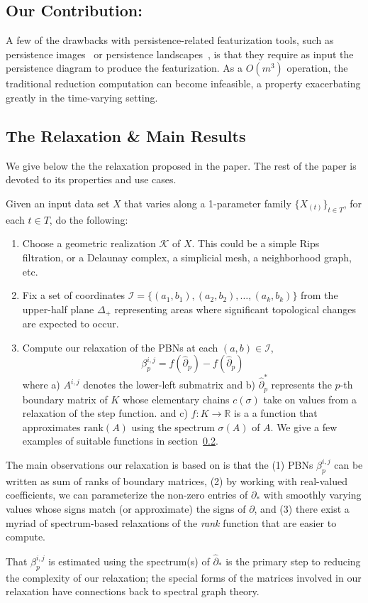\subsection{Our Contribution:}
A few of the drawbacks with persistence-related featurization tools, such as persistence images~\cite{} or persistence landscapes~\cite{}, is that they require as input the persistence diagram to produce the featurization. As a $O(m^3)$ operation, the traditional reduction computation can become infeasible, a property exacerbating greatly in the time-varying setting. 

\subsection{The Relaxation \& Main Results}
We give below the the relaxation proposed in the paper. The rest of the paper is devoted to its properties and use cases. 

Given an input data set $X$ that varies along a 1-parameter family $\{X_{(t)}\}_{t \in T}$, for each $t \in T$, do the following:
\begin{enumerate}
	\item Choose a geometric realization $\mathcal{K}$ of $X$. This could be a simple Rips filtration, or a Delaunay complex, a simplicial mesh, a neighborhood graph, etc. 
	\item Fix a set of coordinates $\mathcal{I} = \{(a_1,b_1), (a_2,b_2), \dots, (a_k,b_k)\}$ from the upper-half plane $\Delta_+$ representing areas where significant topological changes are expected to occur. 
	\item Compute our relaxation of the PBNs at each $(a,b) \in \mathcal{I}$, 
	$$ \beta_{p}^{i,j} = f(\hat{\partial}_p) -  f(\hat{\partial}_p) $$
	where 
	a) $A^{i,j}$ denotes the lower-left submatrix and
	b) $\hat{\partial}_p^{\ast}$ represents the $p$-th boundary matrix of $K$ whose elementary chains $c(\sigma)$ take on values from a relaxation of the step function. 
	and c) $f: K \to \mathbb{R}$ is a a function that approximates $\mathrm{rank}(A)$ using the spectrum $\sigma(A)$ of $A$. 
	We give a few examples of suitable functions in section~\ref{}. 

\end{enumerate}

The main observations our relaxation is based on is that the (1) PBNs $\beta_p^{i,j}$ can be written as sum of ranks of boundary matrices, (2) by working with real-valued coefficients, we can parameterize the non-zero entries of $\partial_\ast$ with smoothly varying values whose signs match (or approximate) the signs of $\partial$, and (3) there exist a myriad of spectrum-based relaxations of the \emph{rank} function that are easier to compute. 

That $\beta_p^{i,j}$ is estimated using the spectrum(s) of $\hat{\partial}_\ast$ is the primary step to reducing the complexity of our relaxation; the special forms of the matrices involved in our relaxation have connections back to spectral graph theory. 
